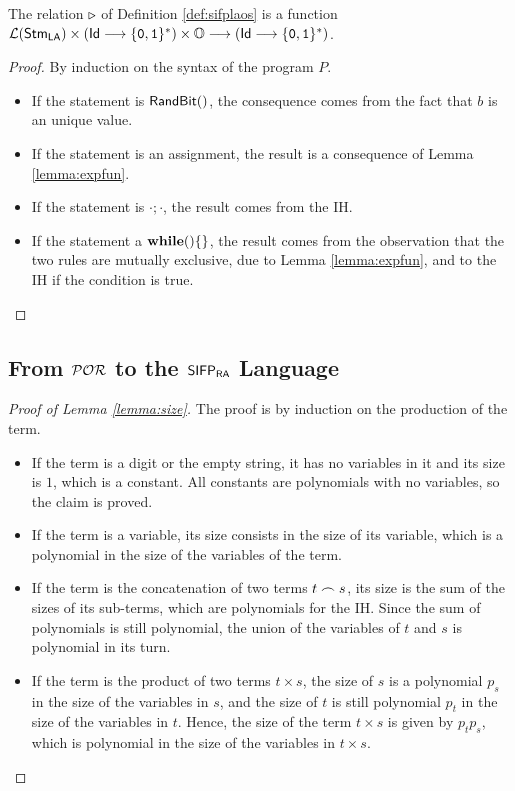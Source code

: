 \begin{lemma}
  \label{lemma:sifplasemfun}
  The relation $\triangleright$ of Definition \ref{def:sifplaos} is a function
  ${\mathcal L ({\mathsf{Stm}_{\mathsf{LA}}})} \times (\mathsf{Id} \longrightarrow \{\mathtt{0}, \mathtt{1}\}^*)\times \mathbb{O}\longrightarrow (\mathsf{Id} \longrightarrow \{\mathtt{0}, \mathtt{1}\}^*)$.
\end{lemma}
\begin{proof}
  By induction on the syntax of the program $P$.
  \begin{itemize}
    \item If the statement is $\mathsf{RandBit()}$, the consequence comes from the fact that $b$ is an unique value.
    \item If the statement is an assignment, the result is a consequence of Lemma \ref{lemma:expfun}.
    \item If the statement is $\cdot;\cdot$, the result comes from the IH.
    \item If the statement a $\mathbf{while}()\{\}$, the result comes from the observation that the two rules are mutually exclusive, due to Lemma \ref{lemma:expfun}, and to the IH if the condition is true.
  \end{itemize}
\end{proof}

\subsection{From $\mathcal{POR}$ to the $\mathsf{SIFP_{{\mathsf{RA}}}}$ Language}
\label{app:portosifpra}


\lpwterm*
\begin{proof}[Proof of Lemma \ref{lemma:size}]
The proof is by induction on the production of the term.
\begin{itemize}
%
\item If the term is a digit or the empty string, it has no variables in it and its size is
$1$, which is a constant.
All constants are polynomials with no variables, so the claim is proved.
%
\item If the term is a variable, its size consists in the size of
its variable, which is a polynomial in the size of the variables of the term.
%
\item If the term is the concatenation
of two terms $t\frown s$, its size is the sum of the sizes of
its sub-terms, which are polynomials for the IH.
Since the sum of polynomials is still polynomial, the union
of the variables of $t$ and $s$ is polynomial in its turn.
%
\item If the term is the product of two terms
$t\times s$, the size of $s$ is a polynomial $p_s$ in
the size of the variables in $s$, and the size of
$t$ is still polynomial $p_t$ in the size of
the variables in $t$.
Hence, the size of the term $t\times s$
is given by $p_tp_s$, which is polynomial
in the size of the variables in $t\times s$.
\end{itemize}
\end{proof}


